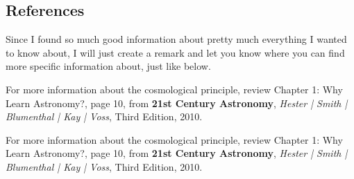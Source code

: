 \subsection{References}

Since I found so much good information about pretty much everything I wanted to know about, I will just create a remark and let you know where you can find more specific information about, just like below.

\begin{remark}
For more information about the cosmological principle, review Chapter 1: Why Learn Astronomy?, page 10, from \textbf{21st Century Astronomy}, \textit{Hester | Smith | Blumenthal | Kay | Voss}, Third Edition, 2010.
\end{remark}
\begin{expli}
For more information about the cosmological principle, review Chapter 1: Why Learn Astronomy?, page 10, from \textbf{21st Century Astronomy}, \textit{Hester | Smith | Blumenthal | Kay | Voss}, Third Edition, 2010.
\end{expli}


